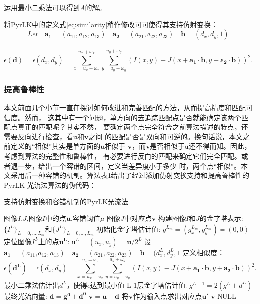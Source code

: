 运用最小二乘法可以得到$A$的解。

将PyrLK中的定义式\ref{eq:similarity}稍作修改可可使得其支持仿射变换：\\
\[ Let\quad \mathbf{a_1}=(a_{11},a_{12},a_{13})\quad \mathbf{a_2}=(a_{21},a_{22},a_{23})\quad
\mathbf{b}=(d_x,d_y,1)\]\\
\begin{equation}\label{eq:affine}
	\epsilon(\mathbf{d})=\epsilon(d_x,d_y)=\sum_{x=u_x-\omega_x}^{u_x+\omega_x}\sum_{y=u_y-\omega_y}
	^{u_y+\omega_y}(I(x,y) - J(x+\mathbf{a_1}\cdot \mathbf{b},y+\mathbf{a_2}\cdot \mathbf{b}))^2.
\end{equation}


\subsubsection{提高鲁棒性}
本文前面几个小节一直在探讨如何改进和完善匹配的方法，从而提高精度和匹配可信度。然而，
这其中有一个问题，单方向的去追踪匹配点是否就能确定该两个匹配点真正的匹配呢？其实不然，
要确定两个点完全符合之前算法描述的特点，还需要反向进行检查，看$\mathbf{u}$和$\mathbf{v}$之间
的匹配是否是双向和可逆的。换句话说，本文之前定义的“相似”其实是单方面的$\mathbf{u}$相似于
$\mathbf{v}$，而$\mathbf{v}$是否相似于$\mathbf{u}$还不得而知。因此，考虑到算法的完整性和鲁棒性，
有必要进行反向的匹配来确定它们完全匹配。或者退一步，给出一个容错的区间，定义当差异度小于多少
时，两个点“相似”。本文采用后一种容错的机制。算法表1给出了经过添加仿射变换支持和提高鲁棒性的PyrLK
光流法算法的伪代码：\\
\begin{algorithm}[H]
	\label{alg:pyrlk}
	\caption{支持仿射变换和容错机制的PyrLK光流法}
	\begin{algorithmic}[1]
		\Require 图像$I$,$J$,图像$I$中的点$\mathbf{u}$,容错阈值$\mu$
		\Ensure 图像$J$中对应点$\mathbf{v}$
		\State 构建图像$I$和$J$的金字塔表示: $\{I^L\}_{L=0,...,L_m}$和$\{J^L\}_{L=0,...,L_m}$
		\State 初始化金字塔估计值: $g^{L_{m}}=(g_x^{L_m}, g_y^{L_m})=(0,0)$
		\State 定位图像$I^L$上的点$\mathbf{u^L}$: $\mathbf{u}^L=(u_x,u_y)=\mathbf{u}/2^L$
		\State 设$\mathbf{a_1}=(a_{11},a_{12},a_{13})\quad \mathbf{a_2}=(a_{21},a_{22},a_{23})\quad 
				\mathbf{b}=(d_x^L, d_y^L, 1$
		\State 定义相似度：
				\[ \epsilon(\mathbf{d^L})=\epsilon(d_x,d_y)=\sum_{x=u_x-\omega_x}^{u_x+\omega_x}\sum_{y=u_y-\omega_y}
				^{u_y+\omega_y}(I(x,y) - J(x+\mathbf{a_1}\cdot \mathbf{b},y+\mathbf{a_2}\cdot \mathbf{b}))^2.\]
				\State 最小二乘法估计出$d^L$，使得$\epsilon $达到最小值
		\State L-1层金字塔估计值: $g^{L-1}=2(g^L+d^L)$
		\EndFor
		\State 最终光流向量: $\mathbf{d}=\mathbf{g^0}+\mathbf{d^0}$
		\State $\mathbf{v}=\mathbf{u+d}$
		\State 将$\mathbf{v}$作为输入点求出对应点$\mathbf{u'}$
			\State \Return $\mathbf{v}$
		\Else
			\State \Return NULL
		\EndIf
	\end{algorithmic}
\end{algorithm}

